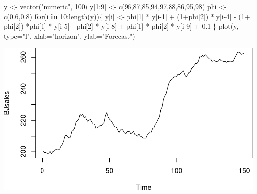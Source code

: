 \documentclass[
]{book}
\newenvironment{Shaded}{\begin{snugshade}}{\end{snugshade}}
\newcommand{\AttributeTok}[1]{\textcolor[rgb]{0.77,0.63,0.00}{#1}}
\newcommand{\ControlFlowTok}[1]{\textcolor[rgb]{0.13,0.29,0.53}{\textbf{#1}}}
\newcommand{\DecValTok}[1]{\textcolor[rgb]{0.00,0.00,0.81}{#1}}
\newcommand{\FloatTok}[1]{\textcolor[rgb]{0.00,0.00,0.81}{#1}}
\newcommand{\FunctionTok}[1]{\textcolor[rgb]{0.00,0.00,0.00}{#1}}
\newcommand{\NormalTok}[1]{#1}
\newcommand{\OtherTok}[1]{\textcolor[rgb]{0.56,0.35,0.01}{#1}}
\newcommand{\SpecialCharTok}[1]{\textcolor[rgb]{0.00,0.00,0.00}{#1}}
\newcommand{\StringTok}[1]{\textcolor[rgb]{0.31,0.60,0.02}{#1}}
\theoremstyle{definition}
\theoremstyle{definition}
\theoremstyle{definition}
\theoremstyle{definition}
\theoremstyle{remark}
\begin{document}
\begin{Shaded}
\begin{Highlighting}[]
\NormalTok{y }\OtherTok{\textless{}{-}} \FunctionTok{vector}\NormalTok{(}\StringTok{"numeric"}\NormalTok{, }\DecValTok{100}\NormalTok{)}
\NormalTok{y[}\DecValTok{1}\SpecialCharTok{:}\DecValTok{9}\NormalTok{] }\OtherTok{\textless{}{-}} \FunctionTok{c}\NormalTok{(}\DecValTok{96}\NormalTok{,}\DecValTok{87}\NormalTok{,}\DecValTok{85}\NormalTok{,}\DecValTok{94}\NormalTok{,}\DecValTok{97}\NormalTok{,}\DecValTok{88}\NormalTok{,}\DecValTok{86}\NormalTok{,}\DecValTok{95}\NormalTok{,}\DecValTok{98}\NormalTok{)}
\NormalTok{phi }\OtherTok{\textless{}{-}} \FunctionTok{c}\NormalTok{(}\FloatTok{0.6}\NormalTok{,}\FloatTok{0.8}\NormalTok{)}
\ControlFlowTok{for}\NormalTok{(i }\ControlFlowTok{in} \DecValTok{10}\SpecialCharTok{:}\FunctionTok{length}\NormalTok{(y))\{}
\NormalTok{    y[i] }\OtherTok{\textless{}{-}}\NormalTok{ phi[}\DecValTok{1}\NormalTok{] }\SpecialCharTok{*}\NormalTok{ y[i}\DecValTok{{-}1}\NormalTok{] }\SpecialCharTok{+}\NormalTok{ (}\DecValTok{1}\SpecialCharTok{+}\NormalTok{phi[}\DecValTok{2}\NormalTok{]) }\SpecialCharTok{*}\NormalTok{ y[i}\DecValTok{{-}4}\NormalTok{] }\SpecialCharTok{{-}}
\NormalTok{      (}\DecValTok{1}\SpecialCharTok{+}\NormalTok{ phi[}\DecValTok{2}\NormalTok{]) }\SpecialCharTok{*}\NormalTok{phi[}\DecValTok{1}\NormalTok{] }\SpecialCharTok{*}\NormalTok{ y[i}\DecValTok{{-}5}\NormalTok{] }\SpecialCharTok{{-}}\NormalTok{ phi[}\DecValTok{2}\NormalTok{] }\SpecialCharTok{*}\NormalTok{ y[i}\DecValTok{{-}8}\NormalTok{] }\SpecialCharTok{+}
\NormalTok{      phi[}\DecValTok{1}\NormalTok{] }\SpecialCharTok{*}\NormalTok{ phi[}\DecValTok{2}\NormalTok{] }\SpecialCharTok{*}\NormalTok{ y[i}\DecValTok{{-}9}\NormalTok{] }\SpecialCharTok{+} \FloatTok{0.1}
\NormalTok{\}}
\FunctionTok{plot}\NormalTok{(y, }\AttributeTok{type=}\StringTok{"l"}\NormalTok{, }\AttributeTok{xlab=}\StringTok{"horizon"}\NormalTok{, }\AttributeTok{ylab=}\StringTok{"Forecast"}\NormalTok{)}
\end{Highlighting}
\end{Shaded}

\includegraphics{adam_files/figure-latex/unnamed-chunk-51-1.pdf}
\end{document}
